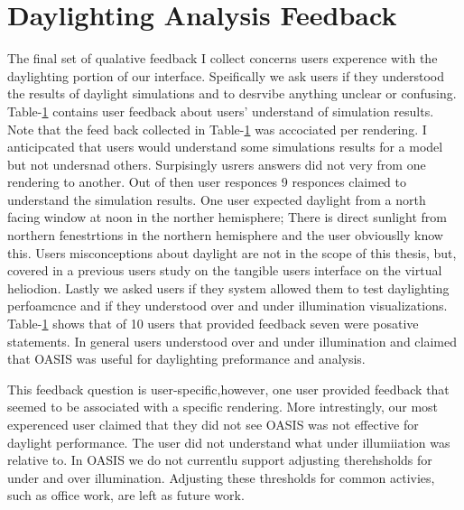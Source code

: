 \section{Daylighting Analysis Feedback}
The final set of qualative feedback I collect concerns users experence with the daylighting portion of our interface.
Speifically we ask users if they understood the results of daylight simulations and to desrvibe anything unclear or confusing.
Table-\ref{} contains user feedback about users' understand of simulation results.
Note that the feed back collected in Table-\ref{} was accociated per rendering.
I anticipcated that users would understand some simulations results for a model but not undersnad others.
Surpisingly usrers answers did not very from one rendering to another.
Out of then user responces 9 responces claimed to understand the simulation results.
One user expected daylight from a north facing window at noon in the norther hemisphere;
There is direct sunlight from northern fenestrtions in the northern hemisphere and the user obviouslly know this.
Users misconceptions about daylight are not in the scope of this thesis, but, covered in a previous users study on the tangible users interface on the virtual heliodion\cite{}.
Lastly we asked users if they system allowed them to test daylighting perfoamcnce and if they understood over and under illumination visualizations.
Table-\ref{} shows that of 10 users that provided feedback seven were posative statements.
In general users understood over and under illumination and claimed that OASIS was useful for daylighting preformance and analysis.

This feedback question is user-specific,however, one user provided feedback that seemed to be associated with a specific rendering.
More intrestingly, our most experenced user claimed that they did not see OASIS was not effective for daylight performance.
The user did not understand what under illumiiation was relative to.
In OASIS we do not currentlu support adjusting therehsholds for under and over illumination.
Adjusting these thresholds for common activies, such as office work, are left as future work.








































